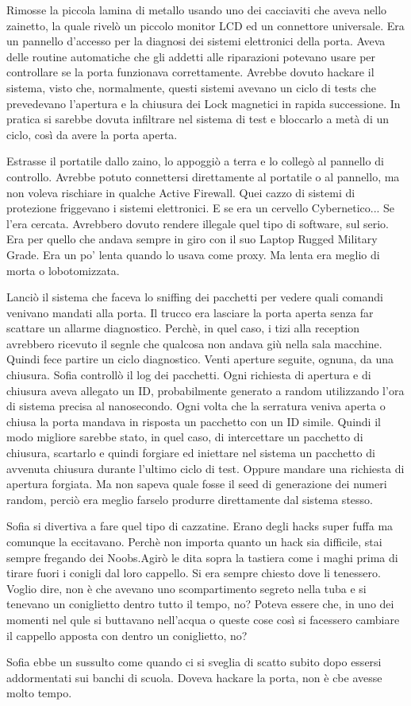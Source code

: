     Rimosse la piccola lamina di metallo usando uno dei cacciaviti che aveva nello zainetto, la quale rivelò un piccolo
    monitor LCD ed un connettore universale. Era un pannello d'accesso per la diagnosi dei sistemi elettronici della
    porta. Aveva delle routine automatiche che gli addetti alle riparazioni potevano usare per controllare se la porta
    funzionava correttamente. Avrebbe dovuto hackare il sistema, visto che, normalmente, questi sistemi avevano un ciclo
    di tests che prevedevano l'apertura e la chiusura dei Lock magnetici in rapida successione. In pratica si sarebbe
    dovuta infiltrare nel sistema di test e bloccarlo a metà di un ciclo, così da avere la porta aperta.

    Estrasse il portatile dallo zaino, lo appoggiò a terra e lo collegò al pannello di controllo. Avrebbe potuto
    connettersi direttamente al portatile o al pannello, ma non voleva rischiare in qualche Active Firewall. Quei cazzo
    di sistemi di protezione friggevano i sistemi elettronici. E se era un cervello Cybernetico... Se l'era cercata.
    Avrebbero dovuto rendere illegale quel tipo di software, sul serio. Era per quello che andava sempre in giro con il
    suo Laptop Rugged Military Grade. Era un po' lenta quando lo usava come proxy. Ma lenta era meglio di morta o
    lobotomizzata.

    Lanciò il sistema che faceva lo sniffing dei pacchetti per vedere quali comandi venivano mandati alla porta. Il
    trucco era lasciare la porta aperta senza far scattare un allarme diagnostico. Perchè, in quel caso, i tizi alla
    reception avrebbero ricevuto il segnle che qualcosa non andava giù nella sala macchine. Quindi fece partire un ciclo
    diagnostico. Venti aperture seguite, ognuna, da una chiusura. Sofia controllò il log dei pacchetti. Ogni richiesta
    di apertura e di chiusura aveva allegato un ID, probabilmente generato a random utilizzando l'ora di sistema precisa
    al nanosecondo. Ogni volta che la serratura veniva aperta o chiusa la porta mandava in risposta un pacchetto con
    un ID simile. Quindi il modo migliore sarebbe stato, in quel caso, di intercettare un pacchetto di chiusura,
    scartarlo e quindi forgiare ed iniettare nel sistema un pacchetto di avvenuta chiusura durante l'ultimo ciclo di test. Oppure mandare una
    richiesta di apertura forgiata. Ma non sapeva quale fosse il seed di generazione dei numeri random, perciò era
    meglio farselo produrre direttamente dal sistema stesso.

    Sofia si divertiva a fare quel tipo di cazzatine. Erano degli hacks super fuffa ma comunque la eccitavano. Perchè
    non importa quanto un hack sia difficile, stai sempre fregando dei Noobs.Agirò le dita sopra la tastiera come i
    maghi prima di tirare fuori i conigli dal loro cappello. Si era sempre chiesto dove li tenessero. Voglio dire, non è
    che avevano uno scompartimento segreto nella tuba e si tenevano un coniglietto dentro tutto il tempo, no? Poteva
    essere che, in uno dei momenti nel qule si buttavano nell'acqua o queste cose così si facessero cambiare il cappello
    apposta con dentro un coniglietto, no?

    Sofia ebbe un sussulto come quando ci si sveglia di scatto subito dopo essersi addormentati sui banchi di scuola.
    Doveva hackare la porta, non è cbe avesse molto tempo.
